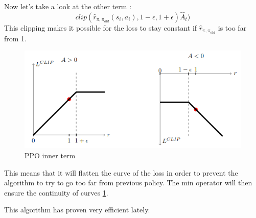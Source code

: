 \documentclass[11pt]{article}
\begin{document}
Now let's take a look at the other term :
$$clip(\hat r_{\pi,\pi_{old}}(s_i,a_i),1-\epsilon,1+\epsilon)\hat A_t)$$
This clipping makes it possible for the loss to stay constant if $\hat r_{\pi,\pi_{old}}$ is too far from 1.

\begin{figure}[!h]
\centering
\includegraphics[scale=0.40]{curve_ppo.png}
\caption{PPO inner term}
\label{ppo_curve}
\end{figure}

This means that it will flatten the curve of the loss  in order to prevent the algorithm to try to go too far from previous policy. The min operator will then ensure the continuity of curves \ref{ppo_curve}.


This algorithm has proven very efficient lately.
\end{document}
